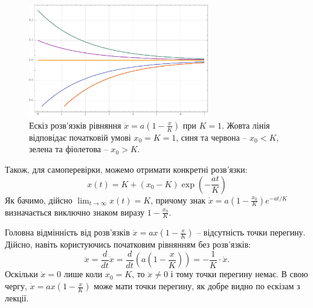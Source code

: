 \documentclass[oneside,solution]{tmpl}
\begin{document}
\begin{figure}
    \centering
    \includegraphics[width=0.7\textwidth]{images/hw_3/sol.pdf}
    \caption{Ескіз розв'язків рівняння $\dot{x}=a(1-\frac{x}{K})$ при $K=1$. Жовта лінія відповідає початковій умові $x_0=K=1$, синя та червона -- $x_0<K$, зелена та фіолетова -- $x_0>K$.}
    \label{fig:sol}
\end{figure}

Також, для самоперевірки, можемо отримати конкретні розв'язки:
\begin{equation}
    x(t) = K + (x_0-K)\exp\left(-\frac{at}{K}\right)
\end{equation}
Як бачимо, дійсно $\lim_{t \to \infty}x(t) = K$, причому знак $\dot{x}=a(1-\frac{x_0}{K})e^{-at/K}$ визначається виключно знаком виразу $1-\frac{x_0}{K}$.

Головна відмінність від розв'язків $\dot{x}=ax(1-\frac{x}{K})$ -- відсутність точки перегину. Дійсно, навіть користуючись початковим рівнянням без розв'язків:
\begin{equation}
    \ddot{x} = \frac{d}{dt}\dot{x} = \frac{d}{dt}\left(a\left(1-\frac{x}{K}\right)\right) = -\frac{1}{K}\cdot \dot{x}.
\end{equation}
Оскільки $\dot{x} = 0$ лише коли $x_0=K$, то $\ddot{x} \neq 0$ і тому точки перегину немає. В свою чергу, $\dot{x}=ax(1-\frac{x}{K})$ може мати точки перегину, як добре видно по ескізам з лекції.
\end{document}
